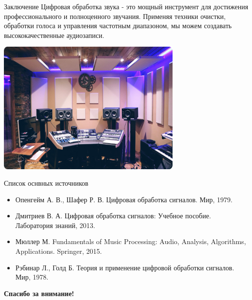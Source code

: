 \documentclass{beamer}
\begin{document}
\begin{frame}{Заключение}
	Цифровая обработка звука - это мощный инструмент для достижения профессионального и полноценного звучания. Применяя техники очистки, обработки голоса и управления частотным диапазоном, мы можем создавать высококачественные аудиозаписи.
	\begin{center}
		\includegraphics[width=0.6\linewidth]{pic7.png} %
	\end{center}
\end{frame}

\begin{frame}{Список оснвных источников}
    \begin{itemize}
        \item Опенгейм А. В., Шафер Р. В. Цифровая обработка сигналов. Мир, 1979.
        \item Дмитриев В. А. Цифровая обработка сигналов: Учебное пособие. Лаборатория знаний, 2013.
        \item Мюллер М. Fundamentals of Music Processing: Audio, Analysis, Algorithms, Applications. Springer, 2015.
        \item Рэбинар Л., Голд Б. Теория и применение цифровой обработки сигналов. Мир, 1978.
    \end{itemize}
\end{frame}

\begin{frame}
    \centering
    \textbf{\huge Спасибо за внимание!}
\end{frame}
\end{document}
